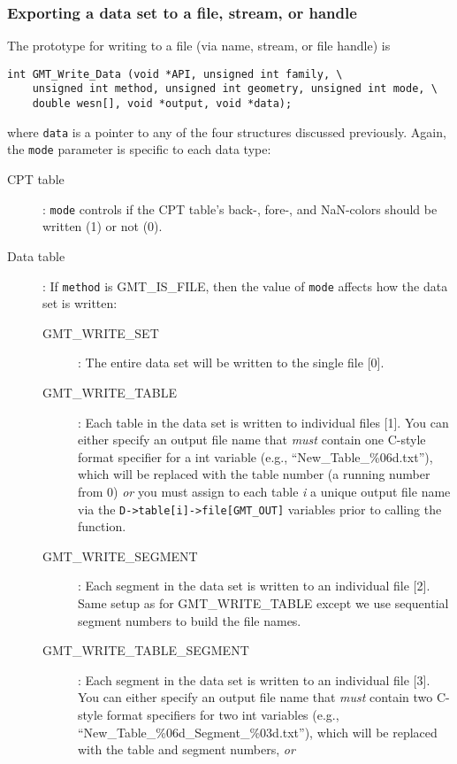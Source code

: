 \documentclass[11pt]{report}
\begin{document}
\subsubsection{Exporting a data set to a file, stream, or handle}
The prototype for writing to a file (via name, stream, or file handle) is

\begin{verbatim}
int GMT_Write_Data (void *API, unsigned int family, \
    unsigned int method, unsigned int geometry, unsigned int mode, \
    double wesn[], void *output, void *data);
\end{verbatim}
where \texttt{data} is a pointer to any of the four structures
discussed previously.  Again, the \texttt{mode} parameter is specific to
each data type:

\begin{description}
\item [CPT table]: \texttt{mode} controls if the CPT table's back-, fore-, and NaN-colors
should be written (1) or not (0).
\item [Data table]: If \texttt{method} is GMT\_IS\_FILE, then the value of
\texttt{mode} affects how the data set is written:
\begin{description}
\item [GMT\_WRITE\_SET]: The entire data set will be written to the single file [0].
\item [GMT\_WRITE\_TABLE]: Each table in the data set is written to individual files [1].
You can either specify an output file name that \emph{must} contain one C-style
format specifier for a int variable (e.g., ``New\_Table\_\%06d.txt''), which will be
replaced with the table number (a running number from 0) \emph{or} you must assign
to each table \emph{i} a unique output file name via the \texttt{D->table[i]->file[GMT\_OUT]}
variables prior to calling the function.
\index{GMT\_WRITE\_TABLE}
\item [GMT\_WRITE\_SEGMENT]: Each segment in the data set is written to an individual file [2].
Same setup as for GMT\_WRITE\_TABLE except we use sequential segment numbers to build the file names.
\index{GMT\_WRITE\_SEGMENT}
\item [GMT\_WRITE\_TABLE\_SEGMENT]: Each segment in the data set is written to an individual file [3].
You can either specify an output file name that \emph{must} contain two C-style
format specifiers for two int variables (e.g., ``New\_Table\_\%06d\_Segment\_\%03d.txt''),
which will be replaced with the table and segment numbers, \emph{or}

\end{description}
\end{description}
\end{document}
